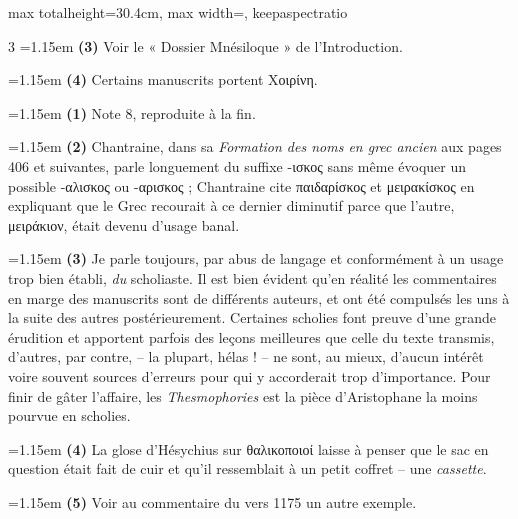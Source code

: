 \documentclass[11pt,twoside]{book}
\newcommand{\italique}[1]{\textit{#1}}
\begin{document}
\begin{adjustbox}{max totalheight=30.4cm, max width=\textwidth, keepaspectratio}
\begin{minipage}{\textwidth}
{\begin{multicols}{3}
\noindent\hangindent=1.15em {\color{sepiaNote}\textbf{(3)}} Voir le « Dossier Mnésiloque » de l'Introduction.
\par\vspace{1.5pt}
\noindent\hangindent=1.15em {\color{sepiaNote}\textbf{(4)}} Certains manuscrits portent Χοιρίνη.
\par\vspace{1.5pt}
\noindent\hangindent=1.15em {\color{sepiaNote}\textbf{(1)}} Note 8, reproduite à la fin.
\par\vspace{1.5pt}
\noindent\hangindent=1.15em {\color{sepiaNote}\textbf{(2)}} Chantraine, dans sa \italique{Formation des noms en grec ancien} aux pages 406 et suivantes, parle longuement du suffixe -ισκος sans même évoquer un possible -αλισκος ou -αρισκος ; Chantraine cite παιδαρίσκος et μειρακίσκος en expliquant que le Grec recourait à ce dernier diminutif parce que l'autre, μειράκιον, était devenu d'usage banal.
\par\vspace{1.5pt}
\noindent\hangindent=1.15em {\color{sepiaNote}\textbf{(3)}} Je parle toujours, par abus de langage et conformément à un usage trop bien établi, \italique{du} scholiaste. Il est bien évident qu'en réalité les commentaires en marge des manuscrits sont de différents auteurs, et ont été compulsés les uns à la suite des autres postérieurement. Certaines scholies font preuve d'une grande érudition et apportent parfois des leçons meilleures que celle du texte transmis, d'autres, par contre, – la plupart, hélas ! – ne sont, au mieux, d'aucun intérêt voire souvent sources d'erreurs pour qui y accorderait trop d'importance. Pour finir de gâter l'affaire, les \italique{Thesmophories} est la pièce d'Aristophane la moins pourvue en scholies.
\par\vspace{1.5pt}
\noindent\hangindent=1.15em {\color{sepiaNote}\textbf{(4)}} La glose d'Hésychius sur θαλικοποιοί laisse à penser que le sac en question était fait de cuir et qu'il ressemblait à un petit coffret -- une \italique{cassette}.
\par\vspace{1.5pt}
\noindent\hangindent=1.15em {\color{sepiaNote}\textbf{(5)}} Voir au commentaire du vers 1175 un autre exemple.
\par\end{multicols}}
\end{minipage}\end{adjustbox}
\end{document}
